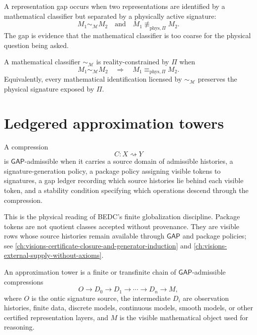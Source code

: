 \begin{definition}
\label{def:representation-gap}
A representation gap occurs when two representations are identified by a mathematical classifier but separated by a physically active signature:
$$
M_1\sim_{\mathcal M}M_2
\quad\text{and}\quad
M_1\not\equiv_{\mathrm{phys},\Pi}M_2.
$$
The gap is evidence that the mathematical classifier is too coarse for the physical question being asked.
\end{definition}

\begin{definition}
\label{def:reality-constrained-classifier}
A mathematical classifier $\sim_{\mathcal M}$ is reality-constrained by $\Pi$ when
$$
M_1\sim_{\mathcal M}M_2
\quad\Longrightarrow\quad
M_1\equiv_{\mathrm{phys},\Pi}M_2.
$$
Equivalently, every mathematical identification licensed by $\sim_{\mathcal M}$ preserves the physical signature exposed by $\Pi$.
\end{definition}

\section{Ledgered approximation towers}
\label{sec:ledgered-approximation-towers}

\begin{definition}
\label{def:gap-admissible-compression}
A compression
$$
C:X\rightsquigarrow Y
$$
is $\mathsf{GAP}$-admissible when it carries a source domain of admissible histories, a signature-generation policy, a package policy assigning visible tokens to signatures, a gap ledger recording which source histories lie behind each visible token, and a stability condition specifying which operations descend through the compression.
\end{definition}

This is the physical reading of BEDC's finite globalization discipline. Package tokens are not quotient classes accepted without provenance. They are visible rows whose source histories remain available through $\mathsf{GAP}$ and package policies; see \autoref{ch:visions-certificate-closure-and-generator-induction} and \autoref{ch:visions-external-supply-without-axioms}.

\begin{definition}
\label{def:reality-constrained-approximation-tower}
An approximation tower is a finite or transfinite chain of $\mathsf{GAP}$-admissible compressions
$$
O
\longrightarrow
D_0
\longrightarrow
D_1
\longrightarrow
\cdots
\longrightarrow
D_n
\longrightarrow
M,
$$
where $O$ is the ontic signature source, the intermediate $D_i$ are observation histories, finite data, discrete models, continuous models, smooth models, or other certified representation layers, and $M$ is the visible mathematical object used for reasoning.
\end{definition}

